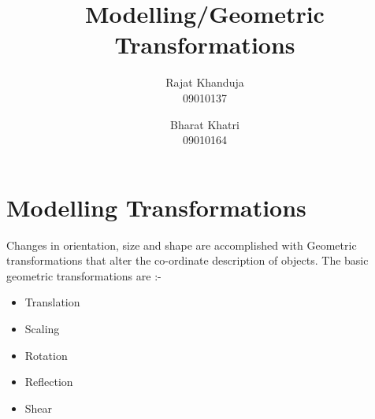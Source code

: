 \documentclass[a4paper,12pt,titlepage,twosided]{article}
\begin{document}
\title{Modelling/Geometric Transformations}

\author{Rajat Khanduja \\
	09010137 \\
	\and
	Bharat Khatri\\
	09010164}
\date{} %

\maketitle

\tableofcontents
\pagebreak

\section{Modelling Transformations}
	Changes in orientation, size and shape are accomplished with Geometric transformations that alter the co-ordinate description of objects. The basic geometric transformations are :- \\
	\begin{itemize}
		\item Translation
		\item Scaling
		\item Rotation
		\item Reflection
		\item Shear
	\end{itemize}
\end{document}
